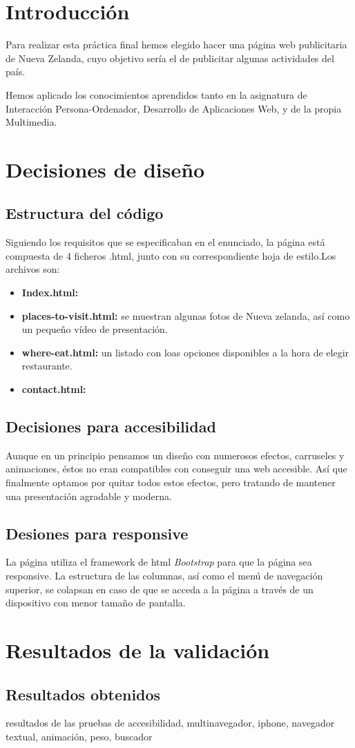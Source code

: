 \section{Introducción}
Para realizar esta práctica final hemos elegido hacer una página web publicitaria de Nueva Zelanda, cuyo objetivo sería el de publicitar algunas actividades del país.

Hemos aplicado los conocimientos aprendidos tanto en la asignatura de Interacción Persona-Ordenador, Desarrollo de Aplicaciones Web, y de la propia Multimedia.
\section{Decisiones de diseño}
\subsection{Estructura del código}
Siguiendo los requisitos que se especificaban en el enunciado, la página está compuesta de 4 ficheros .html, junto con su correspondiente hoja de estilo.Los archivos son:
\begin{itemize}
	\item \textbf{Index.html: }
	\item \textbf{places-to-visit.html: } se muestran algunas fotos de Nueva zelanda, así como un pequeño vídeo de presentación.
	\item \textbf{where-eat.html: }un listado con loas opciones disponibles a la hora de elegir restaurante.
	\item \textbf{contact.html: }
\end{itemize}

\subsection{Decisiones para accesibilidad}

Aunque en un principio pensamos un diseño con numerosos efectos, carruseles y animaciones, éstos no eran compatibles con conseguir una web accesible. Así que finalmente optamos por quitar todos estos efectos, pero tratando de mantener una presentación agradable y moderna.

\subsection{Desiones para responsive}
La página utiliza el framework de html \textit{Bootstrap} para que la página sea responsive. La estructura de las columnas, así como el menú de navegación superior, se colapsan en caso de que se acceda a la página a través de un dispositivo con menor tamaño de pantalla.
\section{Resultados de la validación}
\subsection{Resultados obtenidos}
resultados de las pruebas de accesibilidad, multinavegador, iphone, navegador textual, animación, peso, buscador




